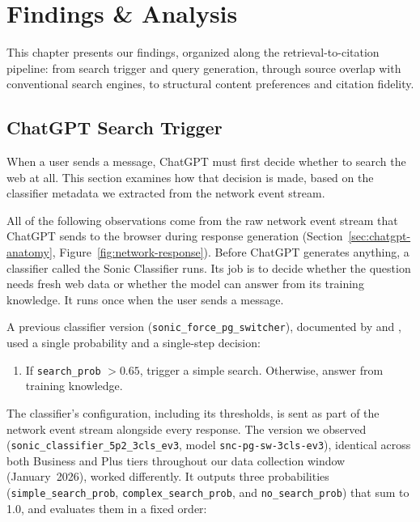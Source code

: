 \chapter{Findings \& Analysis}
\label{ch:findings}

This chapter presents our findings, organized along the retrieval-to-citation pipeline: from search trigger and query generation, through source overlap with conventional search engines, to structural content preferences and citation fidelity.

\section{ChatGPT Search Trigger}
\label{sec:fanout}
\label{sec:search-trigger-section}

When a user sends a message, ChatGPT must first decide whether to search the web at all. This section examines how that decision is made, based on the classifier metadata we extracted from the network event stream.

\label{sec:search-trigger}
\label{sec:three-layer}

All of the following observations come from the raw network event stream that ChatGPT sends to the browser during response generation (Section~\ref{sec:chatgpt-anatomy}, Figure~\ref{fig:network-response}). Before ChatGPT generates anything, a classifier called the Sonic Classifier runs.
 Its job is to decide whether the question needs fresh web data or whether the model can answer from its training knowledge.
  It runs once when the user sends a message.

A previous classifier version (\texttt{sonic\_force\_pg\_switcher}), documented by \textcite{resoneo2026chatgpt} and \textcite{williamscook2025sonic}, used a single probability and a single-step decision:

\begin{enumerate}
    \item If \texttt{search\_prob} $> 0.65$, trigger a simple search. Otherwise, answer from training knowledge.
\end{enumerate}

\noindent The classifier's configuration, including its thresholds, is sent as part of the network event stream alongside every response.
The version we observed (\texttt{sonic\_classifier\_5p2\_3cls\_ev3}, model \texttt{snc-pg-sw-3cls-ev3}), identical across both Business and Plus tiers throughout our data collection window (January~2026), worked differently. 
It outputs three probabilities (\texttt{simple\_search\_prob}, \texttt{complex\_search\_prob}, and \texttt{no\_search\_prob}) that sum to 1.0, and evaluates them in a fixed order:

